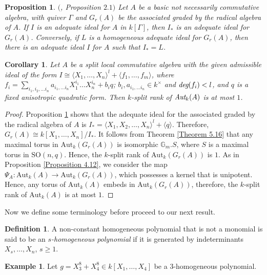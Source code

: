 \documentclass[12pt]{amsart}
\newtheorem{proposition}[theorem]{Proposition}
\newtheorem{corollary}[theorem]{Corollary}
\theoremstyle{definition}
\newtheorem{definition}[theorem]{Definition}
\newtheorem{example}[theorem]{Example}
\numberwithin{equation}{section}
\begin{document}
\vskip2mm

\begin{proposition}\label{Proposition 5.18}
$($\cite{AS1}, \emph{Proposition} $2.1)$ Let $A$ be a basic not necessarily commutative algebra, with quiver $\Gamma$ and $G_{r}(A)$ be the associated graded by the radical algebra of $A$. If $I$ is an adequate ideal for $A$ in $k[\Gamma]$, then $I_{*}$ is an adequate ideal for $G_{r}(A)$. Conversely, if $L$ is a homogeneous adequate ideal for $G_{r}(A)$, then there is an adequate ideal $I$ for $A$ such that $I_{*}=L$.
\end{proposition}

\vskip2mm
\begin{corollary}\label{Corollary 5.19}
Let $A$ be a split local commutative algebra with the given admissible ideal of the form $I\cong \langle X_1,\dots, X_n\rangle^l+\langle f_1,\dots,f_m\rangle $, where $f_i=\sum_{i_1,i_2,...i_n} a_{i_1,...i_n}X_{1}^{i_{1}}\dots X_{n}^{i_{n}}+b_iq$; $b_i, a_{i_1,...i_n}\in k^{\times}$ and $\emph{deg}(f_i)<l$, and $q$ is a fixed anisotropic quadratic form. Then $k$-split rank of $\emph{\text{Aut}}_k(A)$ is at most $1$.
\end{corollary}
\vskip1mm
\begin{proof}
Proposition \ref{Proposition 5.18} shows that the adequate ideal for the associated graded by the radical algebra of $A$ is $I_{*}=\langle X_1, X_2,\dots,X_n \rangle^l+\langle q\rangle$. Therefore, $G_{r}(A)\cong k[X_1,\dots, X_n]/I_{*}$. It follows from Theorem \ref{Theorem 5.16} that any maximal torus in $\text{Aut}_k(G_r(A))$ is isomorphic $\mathbb{G}_m.S$, where $S$ is a maximal torus in $\text{SO}(n,q)$. Hence, the $k$-split rank of $\text{Aut}_k(G_{r}(A))$ is $1$. As in Proposition \ref{Proposition 4.12}, we consider the map $\Psi_A: \text{Aut}_k(A) \rightarrow \text{Aut}_k(G_{r}(A))$, which possesses a kernel that is unipotent. Hence, any torus of $\text{Aut}_k(A)$ embeds in $\text{Aut}_k(G_{r}(A))$, therefore, the $k$-split rank of $\text{Aut}_k(A)$ is at most $1$.
\end{proof}
\vskip2mm
\noindent 
Now we define some terminology before proceed to our next result.
\vskip2mm
\begin{definition}\label{Definition 5.20}
A non-constant homogeneous polynomial that is not a monomial is said to be an \emph{$s$-homogeneous polynomial} if it is generated by indeterminants $X_s,\dots, X_n$, $s\geq 1$. 
\end{definition}
\vskip4mm
\begin{example}\label{Example 5.21}
Let $g=X_3^8+X_4^8\in k[X_1,\dots, X_4]$ be a $3$-homogeneous polynomial.
\end{example}
\end{document}
